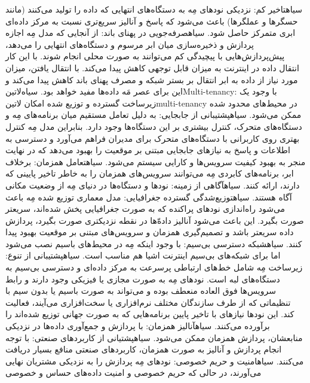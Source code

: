  ‌سیاه{تاخیر کم}: نزدیکی نودهای مِه به دستگاه‌های انتهایی که داده را تولید می‌کنند (مانند حسگرها و عملگرها) باعث می‌شود که پاسخ و آنالیز سریع‌تری
نسبت به مرکز داده‌ای ابری متمرکز حاصل شود.
 ‌سیاه{صرفه‌جویی در پهنای باند}: از آنجایی که مدل مِه اجازه پردازش و ذخیره‌سازی میان ابر مرسوم و دستگاه‌های انتهایی را می‌دهد،
پیش‌پردازش‌هایی با پیچیدگی کم می‌توانند به صورت محلی انجام شوند. با این کار انتقال داده در اینترنت به میزان قابل توجهی کاهش پیدا می‌کند.
با انتقال یافتن، میزان مورد نیاز از داده به ابر انتقال بر بستر شبکه و مصرف پهنای باند کاهش پیدا می‌کند و این برای عصر مَه داده‌ها مفید خواهد بود.
 ‌سیاه{‌لاتین{Multi-tenancy}}: با وجود یک زیرساخت گسترده و توزیع شده امکان ‌لاتین{multi-tenancy} در محیط‌های محدود شده ممکن می‌شود.
 ‌سیاه{پشتیبانی از جابجایی}: به دلیل تعامل مستقیم میان برنامه‌های مِه و دستگاه‌های متحرک، کنترل بیشتری بر این دستگاه‌ها وجود دارد.
بنابراین مدل مِه کنترل بهتری روی کاربرانی با دستگاه‌های متحرک برای مدیران فراهم می‌آورد و دسترسی به اطلاعات و پاسخ به نیازهای جابجایی مبتنی بر موقعیت
را بهبود می‌دهد که در نهایت منجر به بهبود کیفیت سرویس‌ها و کارایی سیستم می‌شود.
 ‌سیاه{تعامل همزمان}: برخلاف ابر، برنامه‌های کابردی مِه می‌توانند سرویس‌های همزمان را به خاطر تاخیر پایینی که دارند، ارائه کنند.
 ‌سیاه{آگاهی از زمینه}: نودها و دستگاه‌ها در دنیای مِه از وضعیت مکانی آگاه هستند.
 ‌سیاه{توزیع‌شدگی گسترده جغرافیایی}: مدل معماری توزیع شده مِه باعث می‌شود راه‌اندازی نودهای پراکنده که به صورت جغرافیایی پخش شده‌اند،
سریعتر صورت بگیرد. این باعث می‌شود آنالیز داده‌ّها در نقطه نزدیکتری صورت بگیرد، پردازش داده سریعتر باشد و تصمیم‌گیری همزمان و سرویس‌های مبتنی
بر موقعیت بهبود پیدا کنند.
 ‌سیاه{شبکه دسترسی بی‌سیم}: با وجود اینکه مِه در محیط‌های باسیم نصب می‌شود اما برای شبکه‌های بی‌سیم اینترنت اشیا هم مناسب است.
 ‌سیاه{پشتیبانی از تنوع}: زیرساخت مِه شامل خط‌های ارتباطی پرسرعت به مرکز داده‌ای و دسترسی بی‌سیم به دستگاه‌های لبه است.
نودهای مِه به صورت مجازی یا فیزیکی وجود دارند و رابط سرویس‌ها فوق العاده منعطف بوده و می‌تواند به صورت باسیم یا بدون سیم با تنظیماتی که از طرف
سازندگان مختلف نرم‌افزاری یا سخت‌افزاری می‌آیند، فعالیت کند. این نودها نیازهای با تاخیر پایین برنامه‌هایی که به صورت جهانی توزیع شده‌اند را برآورده می‌کنند.
 ‌سیاه{آنالیز همزمان}: با پردازش و جمع‌آوری داده‌ها در نزدیکی منابعشان، پردازش همزمان ممکن می‌شود.
 ‌سیاه{پشتیانی از کاربردهای صنعتی}: با توجه انجام پردازش و آنالیز به صورت همزمان، کاربردهای صنعتی منافع بسیار دریافت می‌کنند.
 ‌سیاه{امنیت و حریم خصوصی}: نودهای مِه پردازش را به نزدیکی مشتریان نهایی می‌آورند، در حالی که حریم خصوصی و امنیت داده‌های حساس و خصوصی
